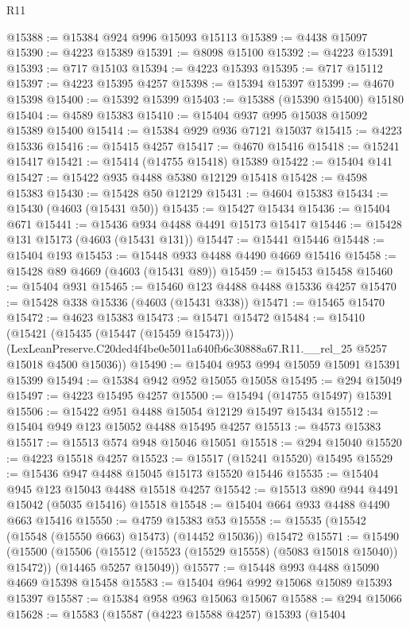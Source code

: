 \begin{lexlean}{R11}
\begin{coremodule}
@15388 := @15384 @924 @996 @15093 @15113
@15389 := @4438 @15097
@15390 := @4223 @15389
@15391 := @8098 @15100
@15392 := @4223 @15391
@15393 := @717 @15103
@15394 := @4223 @15393
@15395 := @717 @15112
@15397 := @4223 @15395 @4257
@15398 := @15394 @15397
@15399 := @4670 @15398
@15400 := @15392 @15399
@15403 := @15388 (@15390 @15400) @15180
@15404 := @4589 @15383
@15410 := @15404 @937 @995 @15038 @15092 @15389 @15400
@15414 := @15384 @929 @936 @7121 @15037
@15415 := @4223 @15336
@15416 := @15415 @4257
@15417 := @4670 @15416
@15418 := @15241 @15417
@15421 := @15414 (@14755 @15418) @15389
@15422 := @15404 @141
@15427 := @15422 @935 @4488 @5380 @12129 @15418
@15428 := @4598 @15383
@15430 := @15428 @50 @12129
@15431 := @4604 @15383
@15434 := @15430 (@4603 (@15431 @50))
@15435 := @15427 @15434
@15436 := @15404 @671
@15441 := @15436 @934 @4488 @4491 @15173 @15417
@15446 := @15428 @131 @15173 (@4603 (@15431 @131))
@15447 := @15441 @15446
@15448 := @15404 @193
@15453 := @15448 @933 @4488 @4490 @4669 @15416
@15458 := @15428 @89 @4669 (@4603 (@15431 @89))
@15459 := @15453 @15458
@15460 := @15404 @931
@15465 := @15460 @123 @4488 @4488 @15336 @4257
@15470 := @15428 @338 @15336 (@4603 (@15431 @338))
@15471 := @15465 @15470
@15472 := @4623 @15383
@15473 := @15471 @15472
@15484 := @15410
    (@15421
      (@15435 (@15447 (@15459 @15473)))
      (LexLeanPreserve.C20ded4f4be0e5011a640fb6c30888a67.R11.__rel_25 @5257 @15018 @4500 @15036))
@15490 := @15404 @953 @994 @15059 @15091 @15391 @15399
@15494 := @15384 @942 @952 @15055 @15058
@15495 := @294 @15049
@15497 := @4223 @15495 @4257
@15500 := @15494 (@14755 @15497) @15391
@15506 := @15422 @951 @4488 @15054 @12129 @15497 @15434
@15512 := @15404 @949 @123 @15052 @4488 @15495 @4257
@15513 := @4573 @15383
@15517 := @15513 @574 @948 @15046 @15051
@15518 := @294 @15040
@15520 := @4223 @15518 @4257
@15523 := @15517 (@15241 @15520) @15495
@15529 := @15436 @947 @4488 @15045 @15173 @15520 @15446
@15535 := @15404 @945 @123 @15043 @4488 @15518 @4257
@15542 := @15513 @890 @944 @4491 @15042 (@5035 @15416) @15518
@15548 := @15404 @664 @933 @4488 @4490 @663 @15416
@15550 := @4759 @15383 @53
@15558 := @15535 (@15542 (@15548 (@15550 @663) @15473) (@14452 @15036)) @15472
@15571 := @15490
    (@15500
      (@15506 (@15512 (@15523 (@15529 @15558) (@5083 @15018 @15040)) @15472))
      (@14465 @5257 @15049))
@15577 := @15448 @993 @4488 @15090 @4669 @15398 @15458
@15583 := @15404 @964 @992 @15068 @15089 @15393 @15397
@15587 := @15384 @958 @963 @15063 @15067
@15588 := @294 @15066
@15628 := @15583
    (@15587
      (@4223 @15588 @4257)
      @15393
      (@15404

\end{coremodule}
\end{lexlean}

